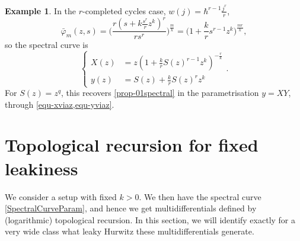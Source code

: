 \documentclass[10pt,a4paper,oneside,no-math,reqno]{amsart}%
\theoremstyle{plain}
\theoremstyle{definition}
\newtheorem{example}[theorem]{Example}
\theoremstyle{remark}
\numberwithin{equation}{section}
\renewcommand{\phi}{\varphi}
\newcommand{\1}{\mathds{1}}
\newcommand{\<}{\langle}
\renewcommand{\>}{\rangle}
\begin{document}

\begin{example}\label{rkSC}
	In the $r$-completed cycles case, $ w(j) = \hbar^{r-1} \frac{j^r}{r}$,
	\begin{equation}
		\bar{\phi}_m (z,s) 
		=
		\Big( \frac{r(s + k \frac{s^r}{r} z^k )^r}{r s^r}\Big)^{\frac{m}{k}}
		=
		\big( 1 + \frac{k}{r} s^{r-1} z^k \big)^{\frac{mr}{k}},
	\end{equation}
    so the spectral curve is
    \begin{equation}
        \begin{cases}
            X(z)
            &=
            z (1 + \frac{k}{r} S(z)^{r-1} z^k )^{-\frac{r}{k}}
            \\
            y(z)
            &=
            S(z) + \frac{k}{r} S(z)^r z^k
        \end{cases}.
    \end{equation}
    For $ S(z) = z^q$, this recovers \cref{prop-01spectral} in the parametrisation $ y = XY $, through \cref{equ-xviaz,equ-yviaz}.
\end{example}



\section{Topological recursion for fixed leakiness} \label{sec:TR}

We consider a setup with fixed $ k > 0$. We then have the spectral curve \eqref{SpectralCurveParam}, and hence we get multidifferentials defined by (logarithmic) topological recursion. In this section, we will identify exactly for a very wide class what leaky Hurwitz these multidifferentials generate.
\end{document}
